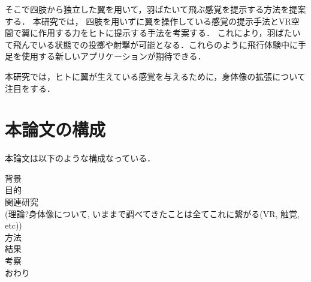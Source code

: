         そこで四肢から独立した翼を用いて，羽ばたいて飛ぶ感覚を提示する方法を提案する．
        本研究では，
        四肢を用いずに翼を操作している感覚の提示手法とVR空間で翼に作用する力をヒトに提示する手法を考案する．
        これにより，羽ばたいて飛んでいる状態での投擲や射撃が可能となる．これらのように飛行体験中に手足を使用する新しいアプリケーションが期待できる．

        本研究では，ヒトに翼が生えている感覚を与えるために，身体像の拡張について注目をする．


\section{本論文の構成}
        本論文は以下のような構成なっている．

        背景\\
        目的\\
        関連研究\\
        (理論?身体像について, いままで調べてきたことは全てこれに繋がる(VR, 触覚, etc))\\
        方法\\
        結果\\
        考察\\
        おわり\\